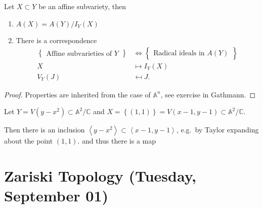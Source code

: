 \begin{theorem}

Let \(X\subset Y\) be an affine subvariety, then

\begin{enumerate}
\def\labelenumi{\alph{enumi}.}
\item
  \(A(X) = A(Y) / I_Y(X)\)
\item
  There is a correspondence
  \begin{align*}  
  \left\{{\substack{\text{Affine subvarieties of }Y}}\right\} 
  &\iff \left\{{\substack{\text{Radical ideals in }A(Y)}}\right\} \\
  X &\mapsto I_Y(X) \\
  V_Y(J) &\mapsfrom J
  .\end{align*}
\end{enumerate}

\end{theorem}

\begin{proof}

Properties are inherited from the case of \({\mathbb{A}}^n\), see
exercise in Gathmann.

\end{proof}

\begin{example}

Let \(Y = V(y-x^2) \subset {\mathbb{A}}^2/{\mathbb{C}}\) and
\(X = \left\{{(1, 1)}\right\} = V(x-1, y-1)\subset {\mathbb{A}}^2/{\mathbb{C}}\).

Then there is an inclusion
\(\left\langle{y-x^2}\right\rangle \subset \left\langle{x-1, y-1}\right\rangle\),
e.g.~by Taylor expanding about the point \((1, 1)\). and thus there is a
map

\begin{center}
\end{center}

\end{example}

\hypertarget{zariski-topology-tuesday-september-01}{%
\section{Zariski Topology (Tuesday, September
01)}\label{zariski-topology-tuesday-september-01}}

